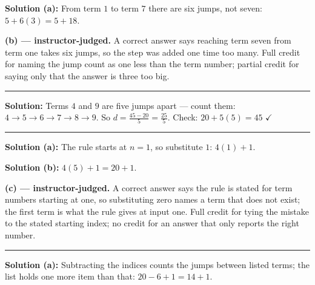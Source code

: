 \documentclass[12pt]{article}
\begin{document}



\textbf{Solution (a):} From term $1$ to term $7$ there are six jumps, not seven: $5 + 6(3) = 5 + 18$. 

\textbf{(b) --- instructor-judged.} A correct answer says reaching term seven from term one takes six jumps, so the step was added one time too many. Full credit for naming the jump count as one less than the term number; partial credit for saying only that the answer is three too big.

\vspace{0.2cm}\noindent\rule{\linewidth}{0.2pt}


\textbf{Solution:} Terms $4$ and $9$ are five jumps apart --- count them: $4\to5\to6\to7\to8\to9$. So $d = \frac{45 - 20}{5} = \frac{25}{5}$. Check: $20 + 5(5) = 45$ $\checkmark$ 

\vspace{0.2cm}\noindent\rule{\linewidth}{0.2pt}


\textbf{Solution (a):} The rule starts at $n = 1$, so substitute $1$: $4(1) + 1$. 

\textbf{Solution (b):} $4(5) + 1 = 20 + 1$. 

\textbf{(c) --- instructor-judged.} A correct answer says the rule is stated for term numbers starting at one, so substituting zero names a term that does not exist; the first term is what the rule gives at input one. Full credit for tying the mistake to the stated starting index; no credit for an answer that only reports the right number.

\vspace{0.2cm}\noindent\rule{\linewidth}{0.2pt}


\textbf{Solution (a):} Subtracting the indices counts the jumps between listed terms; the list holds one more item than that: $20 - 6 + 1 = 14 + 1$. 
\end{document}

